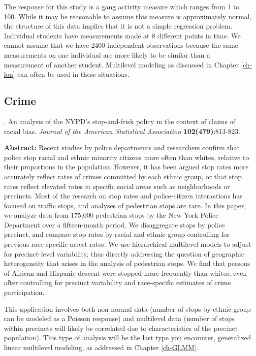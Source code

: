 \documentclass[
]{krantz}
\renewenvironment{quote}{\begin{VF}}{\end{VF}}
\begin{document}
The response for this study is a gang activity measure which ranges from 1 to 100. While it may be reasonable to assume this measure is approximately normal, the structure of this data implies that it is not a simple regression problem. Individual students have measurements made at 8 different points in time. We cannot assume that we have 2400 independent observations because the same measurements on one individual are more likely to be similar than a measurement of another student. Multilevel modeling as discussed in Chapter \ref{ch-lon} can often be used in these situations.

\hypertarget{crime}{%
\subsection{Crime}\label{crime}}

\citet{Gelman2007} . An analysis of the NYPD's stop-and-frisk policy in the context of claims of racial bias. \emph{Journal of the American Statistical Association} \textbf{102(479)}:813-823.

\begin{quote}
\textbf{Abstract:} Recent studies by police departments and researchers confirm that police stop racial and ethnic minority citizens more often than whites, relative to their proportions in the population. However, it has been argued stop rates more accurately reflect rates of crimes committed by each ethnic group, or that stop rates reflect elevated rates in specific social areas such as neighborhoods or precincts. Most of the research on stop rates and police-citizen interactions has focused on traffic stops, and analyses of pedestrian stops are rare. In this paper, we analyze data from 175,000 pedestrian stops by the New York Police Department over a fifteen-month period. We disaggregate stops by police precinct, and compare stop rates by racial and ethnic group controlling for previous race-specific arrest rates. We use hierarchical multilevel models to adjust for precinct-level variability, thus directly addressing the question of geographic heterogeneity that arises in the analysis of pedestrian stops. We find that persons of African and Hispanic descent were stopped more frequently than whites, even after controlling for precinct variability and race-specific estimates of crime participation.
\end{quote}

This application involves both non-normal data (number of stops by ethnic group can be modeled as a Poisson response) and multilevel data (number of stops within precincts will likely be correlated due to characteristics of the precinct population). This type of analysis will be the last type you encounter, generalized linear multilevel modeling, as addressed in Chapter \ref{ch-GLMM}.
\end{document}
